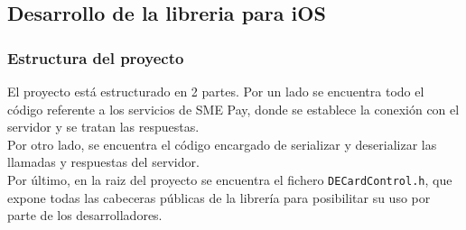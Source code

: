 \documentclass[a4paper, 12pt]{article}
\begin{document}
\subsection{Desarrollo de la libreria para iOS}
\label{sec-4-2}
\subsubsection{Estructura del proyecto}
\label{sec-4-2-1}
El proyecto está estructurado en 2 partes. Por un lado se encuentra todo el código referente a los servicios de SME Pay, donde se establece la conexión con el servidor y se tratan las respuestas.
\\
Por otro lado, se encuentra el código encargado de serializar y deserializar las llamadas y respuestas del servidor.
\\
Por último, en la raiz del proyecto se encuentra el fichero \verb~DECardControl.h~, que expone todas las cabeceras públicas de la librería para posibilitar su uso por parte de los desarrolladores.
\end{document}
